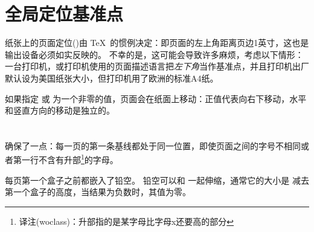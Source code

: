 \documentclass{book}
\begin{document}
\section{全局定位基准点}

纸张上的页面定位()由 \TeX\ 的惯例决定：即页面的左上角距离页边1英寸，这也是输出设备必须如实反映的。
不幸的是，这可能会导致许多麻烦，考虑以下情形：一台打印机，或打印机使用的页面描述语言把\emph{左下角}当作基准点，并且打印机出厂默认设为美国纸张大小，但打印机用了欧洲的标准A4纸。

如果指定  或  为一个非零的值，页面会在纸面上移动：正值代表向右下移动，水平和竖直方向的移动是独立的。

\section{\protect{}}

 确保了一点：每一页的第一条基线都处于同一位置，即使页面之间的字号不相同或者第一行不含有升部\footnote{译注(woclass)：升部指的是某字母比字母x还要高的部分}的字母。

每页第一个盒子之前都嵌入了铅空。
铅空可以和  一起伸缩，通常它的大小是  减去第一个盒子的高度，当结果为负数时，其值为零。
\end{document}
